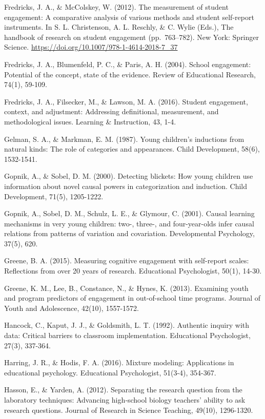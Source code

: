\documentclass[]{book}
\theoremstyle{definition}
\theoremstyle{definition}
\theoremstyle{definition}
\theoremstyle{remark}
\begin{document}
Fredricks, J. A., \& McColskey, W. (2012). The measurement of student
engagement: A comparative analysis of various methods and student
self-report instruments. In S. L. Christenson, A. L. Reschly, \& C.
Wylie (Eds.), The handbook of research on student engagement
(pp.~763--782). New York: Springer Science.
\url{https://doi.org/10.1007/978-1-4614-2018-7_37}

Fredricks, J. A., Blumenfeld, P. C., \& Paris, A. H. (2004). School
engagement: Potential of the concept, state of the evidence. Review of
Educational Research, 74(1), 59-109.

Fredricks, J. A., Filsecker, M., \& Lawson, M. A. (2016). Student
engagement, context, and adjustment: Addressing definitional,
measurement, and methodological issues. Learning \& Instruction, 43,
1-4.

Gelman, S. A., \& Markman, E. M. (1987). Young children's inductions
from natural kinds: The role of categories and appearances. Child
Development, 58(6), 1532-1541.

Gopnik, A., \& Sobel, D. M. (2000). Detecting blickets: How young
children use information about novel causal powers in categorization and
induction. Child Development, 71(5), 1205-1222.

Gopnik, A., Sobel, D. M., Schulz, L. E., \& Glymour, C. (2001). Causal
learning mechanisms in very young children: two-, three-, and
four-year-olds infer causal relations from patterns of variation and
covariation. Developmental Psychology, 37(5), 620.

Greene, B. A. (2015). Measuring cognitive engagement with self-report
scales: Reflections from over 20 years of research. Educational
Psychologist, 50(1), 14-30.

Greene, K. M., Lee, B., Constance, N., \& Hynes, K. (2013). Examining
youth and program predictors of engagement in out-of-school time
programs. Journal of Youth and Adolescence, 42(10), 1557-1572.

Hancock, C., Kaput, J. J., \& Goldsmith, L. T. (1992). Authentic inquiry
with data: Critical barriers to classroom implementation. Educational
Psychologist, 27(3), 337-364.

Harring, J. R., \& Hodis, F. A. (2016). Mixture modeling: Applications
in educational psychology. Educational Psychologist, 51(3-4), 354-367.

Hasson, E., \& Yarden, A. (2012). Separating the research question from
the laboratory techniques: Advancing high‐school biology teachers'
ability to ask research questions. Journal of Research in Science
Teaching, 49(10), 1296-1320.
\end{document}
